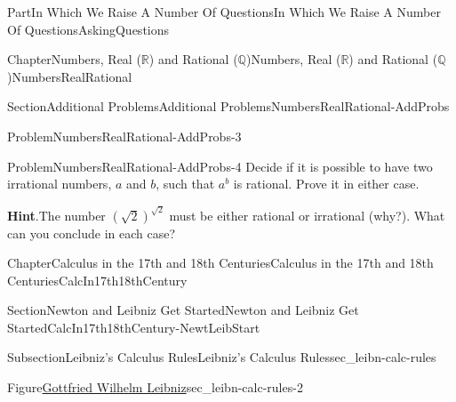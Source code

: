 \documentclass[oneside,10pt,]{book}
\newcommand{\blocktitlefont}{\relax}
\numberwithin{equation}{part}
\newcommand{\RR}{\mathbb {R}}
\newcommand{\QQ}{\mathbb {Q}}
\begin{document}
\begin{partptx}{Part}{In Which We Raise A Number Of Questions}{}{In Which We Raise A Number Of Questions}{}{}{AskingQuestions}
\begin{chapterptx}{Chapter}{Numbers, Real (\(\RR\)) and Rational (\(\QQ\))}{}{Numbers, Real (\(\RR\)) and Rational (\(\QQ\))}{}{}{NumbersRealRational}
\begin{sectionptx}{Section}{Additional Problems}{}{Additional Problems}{}{}{NumbersRealRational-AddProbs}
\begin{problem}{Problem}{}{NumbersRealRational-AddProbs-3}
\end{problem}
\begin{problem}{Problem}{}{NumbersRealRational-AddProbs-4}%
Decide if it is possible to have two irrational numbers, \(a\) and \(b\), such that \(a^b\) is rational. Prove it in either case.%
\par\smallskip%
\noindent\textbf{\blocktitlefont Hint}.\hypertarget{NumbersRealRational-AddProbs-4-5}{}\quad{}The number \(\left( \sqrt{2}\right)^{\sqrt{2}}\) must be either rational or irrational (why?). What can you conclude in each case?%
\end{problem}
\end{sectionptx}
\end{chapterptx}
%
%
\typeout{************************************************}
\typeout{************************************************}
%
\begin{chapterptx}{Chapter}{Calculus in the 17th and 18th Centuries}{}{Calculus in the 17th and 18th Centuries}{}{}{CalcIn17th18thCentury}
\renewcommand*{\chaptername}{Chapter}
%
%
\typeout{************************************************}
\typeout{************************************************}
%
\begin{sectionptx}{Section}{Newton and Leibniz Get Started}{}{Newton and Leibniz Get Started}{}{}{CalcIn17th18thCentury-NewtLeibStart}
%
%
\typeout{************************************************}
\typeout{************************************************}
%
\begin{subsectionptx}{Subsection}{Leibniz's Calculus Rules}{}{Leibniz's Calculus Rules}{}{}{sec_leibn-calc-rules}
\begin{figureptx}{Figure}{\href{https://mathshistory.st-andrews.ac.uk/Biographies/Leibniz/}{Gottfried Wilhelm Leibniz}\protect\footnotemark{}}{sec_leibn-calc-rules-2}{}%
%
\begin{image}{0.325}{0.35}{0.325}{}%

\end{image}
\end{figureptx}
\end{subsectionptx}
\end{sectionptx}
\end{chapterptx}
\end{partptx}
\end{document}
